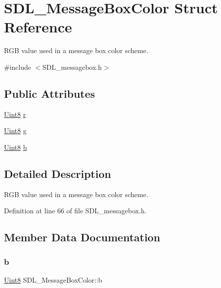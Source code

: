 \hypertarget{struct_s_d_l___message_box_color}{}\section{S\+D\+L\+\_\+\+Message\+Box\+Color Struct Reference}
\label{struct_s_d_l___message_box_color}


R\+GB value used in a message box color scheme.  




{\ttfamily \#include $<$S\+D\+L\+\_\+messagebox.\+h$>$}

\subsection*{Public Attributes}
\begin{DoxyCompactItemize}
\item 
\mbox{\hyperlink{_s_d_l__stdinc_8h_a2944638813a090aa23e62f4da842c3e2}{Uint8}} \mbox{\hyperlink{struct_s_d_l___message_box_color_a43ab2172c10058380fcf67ecc3f53184}{r}}
\item 
\mbox{\hyperlink{_s_d_l__stdinc_8h_a2944638813a090aa23e62f4da842c3e2}{Uint8}} \mbox{\hyperlink{struct_s_d_l___message_box_color_a5820adab0b32aa3eade101ea36ed6b4a}{g}}
\item 
\mbox{\hyperlink{_s_d_l__stdinc_8h_a2944638813a090aa23e62f4da842c3e2}{Uint8}} \mbox{\hyperlink{struct_s_d_l___message_box_color_ad1215a42167cb5b190ff8f19dbd42066}{b}}
\end{DoxyCompactItemize}


\subsection{Detailed Description}
R\+GB value used in a message box color scheme. 

Definition at line 66 of file S\+D\+L\+\_\+messagebox.\+h.



\subsection{Member Data Documentation}
\mbox{\label{struct_s_d_l___message_box_color_ad1215a42167cb5b190ff8f19dbd42066}} 
\subsubsection{\texorpdfstring{b}{b}}
{\footnotesize\ttfamily \mbox{\hyperlink{_s_d_l__stdinc_8h_a2944638813a090aa23e62f4da842c3e2}{Uint8}} S\+D\+L\+\_\+\+Message\+Box\+Color\+::b}



